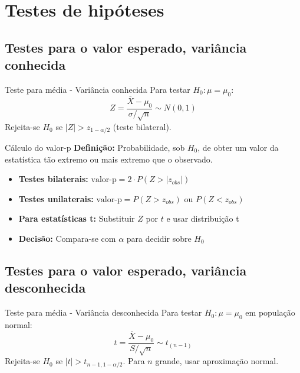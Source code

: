 \documentclass[a4paper,12pt]{article}
\begin{document}
\newpage

\section{\color{sectioncolor}Testes de hipóteses}
\subsection{Testes para o valor esperado, variância conhecida}

\begin{formulabox}{Teste para média - Variância conhecida}
Para testar $H_0: \mu = \mu_0$:
\begin{equation}\label{formula29}\tag{Fórmula 29}
    Z = \frac{\overline{X} - \mu_0}{\sigma/\sqrt{n}} \sim N(0,1)
\end{equation}
Rejeita-se $H_0$ se $|Z| > z_{1-\alpha/2}$ (teste bilateral).
\end{formulabox}

\begin{formulabox}{Cálculo do valor-p}
\textbf{Definição:} Probabilidade, sob $H_0$, de obter um valor da estatística tão extremo ou mais extremo que o observado.

\begin{itemize}
    \item \textbf{Testes bilaterais:} $\text{valor-p} = 2 \cdot P(Z > |z_{obs}|)$
    \item \textbf{Testes unilaterais:} $\text{valor-p} = P(Z > z_{obs})$ ou $P(Z < z_{obs})$
    \item \textbf{Para estatísticas t:} Substituir $Z$ por $t$ e usar distribuição t
    \item \textbf{Decisão:} Compara-se com $\alpha$ para decidir sobre $H_0$
\end{itemize}
\end{formulabox}

\subsection{Testes para o valor esperado, variância desconhecida}

\begin{formulabox}{Teste para média - Variância desconhecida}
Para testar $H_0: \mu = \mu_0$ em população normal:
\begin{equation}\label{formula30}\tag{Fórmula 30}
    t = \frac{\overline{X} - \mu_0}{S/\sqrt{n}} \sim t_{(n-1)}
\end{equation}
Rejeita-se $H_0$ se $|t| > t_{n-1,1-\alpha/2}$. Para $n$ grande, usar aproximação normal.
\end{formulabox}
\end{document}
